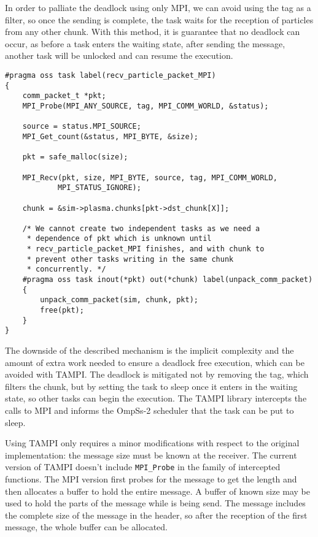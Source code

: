 In order to palliate the deadlock using only MPI, we can avoid using the tag as 
a filter, so once the sending is complete, the task waits for the reception of 
particles from any other chunk.  With this method, it is guarantee that no 
deadlock can occur, as before a task enters the waiting state, after sending the 
message, another task will be unlocked and can resume the execution.
%
\begin{lstlisting}
#pragma oss task label(recv_particle_packet_MPI)
{
	comm_packet_t *pkt;
	MPI_Probe(MPI_ANY_SOURCE, tag, MPI_COMM_WORLD, &status);

	source = status.MPI_SOURCE;
	MPI_Get_count(&status, MPI_BYTE, &size);

	pkt = safe_malloc(size);

	MPI_Recv(pkt, size, MPI_BYTE, source, tag, MPI_COMM_WORLD,
			MPI_STATUS_IGNORE);

	chunk = &sim->plasma.chunks[pkt->dst_chunk[X]];

	/* We cannot create two independent tasks as we need a
	 * dependence of pkt which is unknown until
	 * recv_particle_packet_MPI finishes, and with chunk to
	 * prevent other tasks writing in the same chunk
	 * concurrently. */
	#pragma oss task inout(*pkt) out(*chunk) label(unpack_comm_packet)
	{
		unpack_comm_packet(sim, chunk, pkt);
		free(pkt);
	}
}
\end{lstlisting}
%
The downside of the described mechanism is the implicit complexity and the 
amount of extra work needed to ensure a deadlock free execution, which can be 
avoided with TAMPI. The deadlock is mitigated not by removing the tag, which 
filters the chunk, but by setting the task to sleep once it enters in the 
waiting state, so other tasks can begin the execution. The TAMPI library 
intercepts the calls to MPI and informs the OmpSs-2 scheduler that the task can 
be put to sleep.

Using TAMPI only requires a minor modifications with respect to the original 
implementation: the message size must be known at the receiver. The current 
version of TAMPI doesn't include \texttt{MPI\_Probe} in the family of 
intercepted functions. The MPI version first probes for the message to get the 
length and then allocates a buffer to hold the entire message. A buffer of known 
size may be used to hold the parts of the message while is being send. The 
message includes the complete size of the message in the header, so after the 
reception of the first message, the whole buffer can be allocated.

